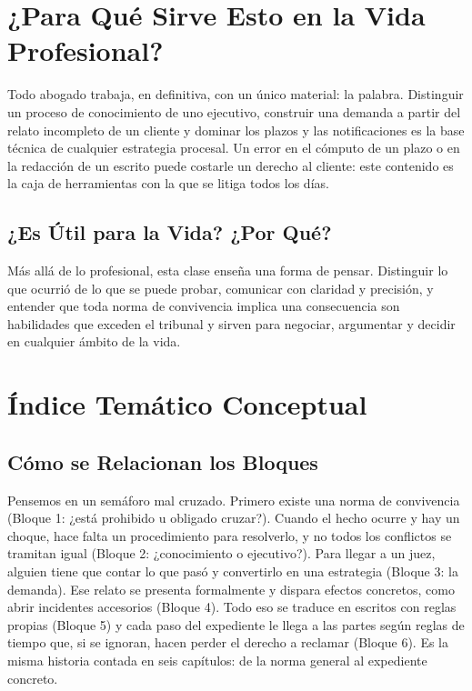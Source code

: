 \documentclass[12pt,oneside]{book}
\begin{document}

\chapter*{¿Para Qué Sirve Esto en la Vida Profesional?}

Todo abogado trabaja, en definitiva, con un único material: la palabra. Distinguir un proceso de conocimiento de uno ejecutivo, construir una demanda a partir del relato incompleto de un cliente y dominar los plazos y las notificaciones es la base técnica de cualquier estrategia procesal. Un error en el cómputo de un plazo o en la redacción de un escrito puede costarle un derecho al cliente: este contenido es la caja de herramientas con la que se litiga todos los días.

\section*{¿Es Útil para la Vida? ¿Por Qué?}

Más allá de lo profesional, esta clase enseña una forma de pensar. Distinguir lo que ocurrió de lo que se puede probar, comunicar con claridad y precisión, y entender que toda norma de convivencia implica una consecuencia son habilidades que exceden el tribunal y sirven para negociar, argumentar y decidir en cualquier ámbito de la vida.


\chapter*{Índice Temático Conceptual}

\section*{Cómo se Relacionan los Bloques}

Pensemos en un semáforo mal cruzado. Primero existe una norma de convivencia (Bloque 1: ¿está prohibido u obligado cruzar?). Cuando el hecho ocurre y hay un choque, hace falta un procedimiento para resolverlo, y no todos los conflictos se tramitan igual (Bloque 2: ¿conocimiento o ejecutivo?). Para llegar a un juez, alguien tiene que contar lo que pasó y convertirlo en una estrategia (Bloque 3: la demanda). Ese relato se presenta formalmente y dispara efectos concretos, como abrir incidentes accesorios (Bloque 4). Todo eso se traduce en escritos con reglas propias (Bloque 5) y cada paso del expediente le llega a las partes según reglas de tiempo que, si se ignoran, hacen perder el derecho a reclamar (Bloque 6). Es la misma historia contada en seis capítulos: de la norma general al expediente concreto.
\end{document}

